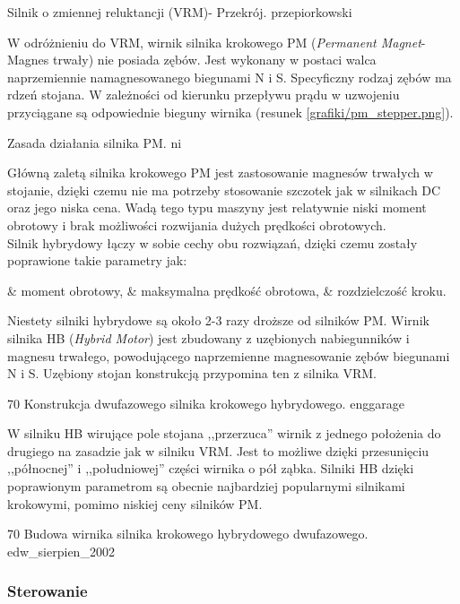 		{Silnik o zmiennej reluktancji (VRM)- Przekrój.}
		{przepiorkowski}

W odróżnieniu do VRM, wirnik silnika krokowego PM ({\em Permanent Magnet}- Magnes trwały) nie posiada zębów. Jest wykonany w postaci walca naprzemiennie namagnesowanego biegunami N i S. Specyficzny rodzaj zębów ma rdzeń stojana. W zależności od kierunku przepływu prądu w uzwojeniu przyciągane są odpowiednie bieguny wirnika (resunek \ref{grafiki/pm_stepper.png}).

		{Zasada działania silnika PM.}
		{ni}
		
Główną zaletą silnika krokowego PM jest zastosowanie magnesów trwałych w stojanie, dzięki czemu nie ma potrzeby stosowanie szczotek jak w silnikach DC oraz jego niska cena. Wadą tego typu maszyny jest relatywnie niski moment obrotowy i brak możliwości rozwijania dużych prędkości obrotowych. \\

Silnik hybrydowy łączy w sobie cechy obu rozwiązań, dzięki czemu zostały poprawione takie parametry jak:
\begin{easylist}
	& moment obrotowy, 
	& maksymalna prędkość obrotowa, 
	& rozdzielczość kroku.
	\\
\end{easylist}

Niestety silniki hybrydowe są około 2-3 razy droższe od silników PM. Wirnik silnika HB ({\em Hybrid Motor}) jest zbudowany z uzębionych nabiegunników i magnesu trwałego, powodującego naprzemienne magnesowanie zębów biegunami N i S. Uzębiony stojan konstrukcją przypomina ten z silnika VRM. 

		{70}
		{Konstrukcja dwufazowego silnika krokowego hybrydowego.}
		{enggarage}
		
W silniku HB wirujące pole stojana ,,przerzuca'' wirnik z jednego położenia do drugiego na zasadzie jak w silniku VRM. Jest to możliwe dzięki przesunięciu ,,północnej'' i ,,południowej'' części wirnika o pół ząbka. Silniki HB dzięki poprawionym parametrom są obecnie najbardziej popularnymi silnikami krokowymi, pomimo niskiej ceny silników PM.
		
		{70}
		{Budowa wirnika silnika krokowego hybrydowego dwufazowego.}
		{edw_sierpien_2002}

\subsubsection{Sterowanie}
\label{sss:sterowanie_krokowy}

